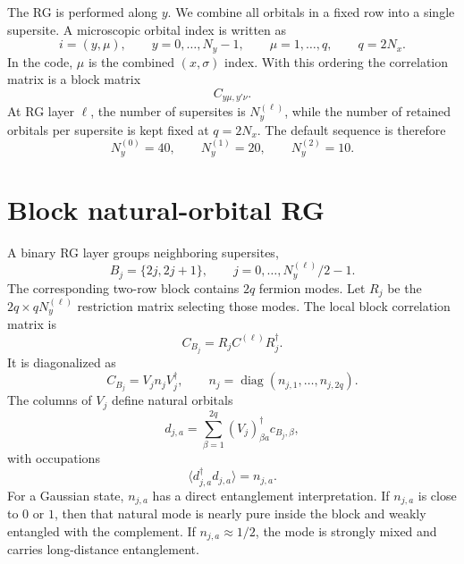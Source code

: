 \documentclass[aps,prb,twocolumn,floatfix]{revtex4-2}
\newcommand{\diag}{\operatorname{diag}}
\begin{document}
The RG is performed along \(y\).  We combine all orbitals in a fixed row into a
single supersite.  A microscopic orbital index is written as
\begin{equation}
  i=(y,\mu),
  \qquad
  y=0,\ldots,N_y-1,
  \qquad
  \mu=1,\ldots,q,
  \qquad
  q=2N_x.
  \label{eq:supersite-index}
\end{equation}
In the code, \(\mu\) is the combined \((x,\sigma)\) index.  With this ordering
the correlation matrix is a block matrix
\begin{equation}
  C_{y\mu,y'\nu}.
\end{equation}
At RG layer \(\ell\), the number of supersites is \(N_y^{(\ell)}\), while the
number of retained orbitals per supersite is kept fixed at \(q=2N_x\).  The
default sequence is therefore
\begin{equation}
  N_y^{(0)}=40,\qquad
  N_y^{(1)}=20,\qquad
  N_y^{(2)}=10.
  \label{eq:ny-flow}
\end{equation}

\section{Block natural-orbital RG}

A binary RG layer groups neighboring supersites,
\begin{equation}
  B_j=\{2j,2j+1\},
  \qquad
  j=0,\ldots,N_y^{(\ell)}/2-1.
\end{equation}
The corresponding two-row block contains \(2q\) fermion modes.  Let \(R_j\) be
the \(2q\times qN_y^{(\ell)}\) restriction matrix selecting those modes.  The
local block correlation matrix is
\begin{equation}
  C_{B_j} = R_j C^{(\ell)} R_j^\dagger.
  \label{eq:block-c}
\end{equation}
It is diagonalized as
\begin{equation}
  C_{B_j}=V_j n_j V_j^\dagger,
  \qquad
  n_j=\diag(n_{j,1},\ldots,n_{j,2q}).
  \label{eq:natural-orbitals}
\end{equation}
The columns of \(V_j\) define natural orbitals
\begin{equation}
  d_{j,a}=\sum_{\beta=1}^{2q}(V_j)_{\beta a}^\dagger c_{B_j,\beta},
\end{equation}
with occupations
\begin{equation}
  \langle d_{j,a}^\dagger d_{j,a}\rangle=n_{j,a}.
\end{equation}
For a Gaussian state, \(n_{j,a}\) has a direct entanglement interpretation.  If
\(n_{j,a}\) is close to \(0\) or \(1\), then that natural mode is nearly pure
inside the block and weakly entangled with the complement.  If
\(n_{j,a}\approx 1/2\), the mode is strongly mixed and carries long-distance
entanglement.
\end{document}
